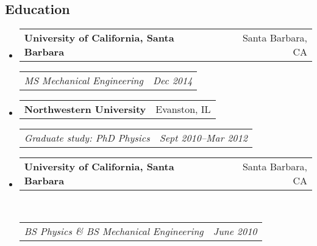 \documentclass[10pt,letterpaper]{article}
\makeatletter
\newcommand{\headerrow}[2]
{\begin{tabular*}{\linewidth}{l@{\extracolsep{\fill}}r}
	#1 &
	#2 \\
\end{tabular*}}
\makeatother
\begin{document}
\subsection*{Education}
\begin{itemize}
	\parskip=-0.1em
	\item 
	\headerrow
		{\textbf{University of California, Santa Barbara}}
		{Santa Barbara, CA}
	\headerrow
		{\emph{MS  Mechanical Engineering}}
		{\emph{Dec 2014}}
	\item 
	\headerrow
		{\textbf{Northwestern University}}
		{Evanston, IL}
	\headerrow
		{\emph{Graduate study: PhD Physics}}
		{\emph{Sept 2010--Mar 2012}}
	\item 
	\headerrow
		{\textbf{University of California, Santa Barbara}}
		{Santa Barbara, CA}	\\
	\headerrow
		{\emph{BS Physics \&  BS Mechanical Engineering}}
		{\emph{June 2010}}
\end{itemize}
\end{document}
